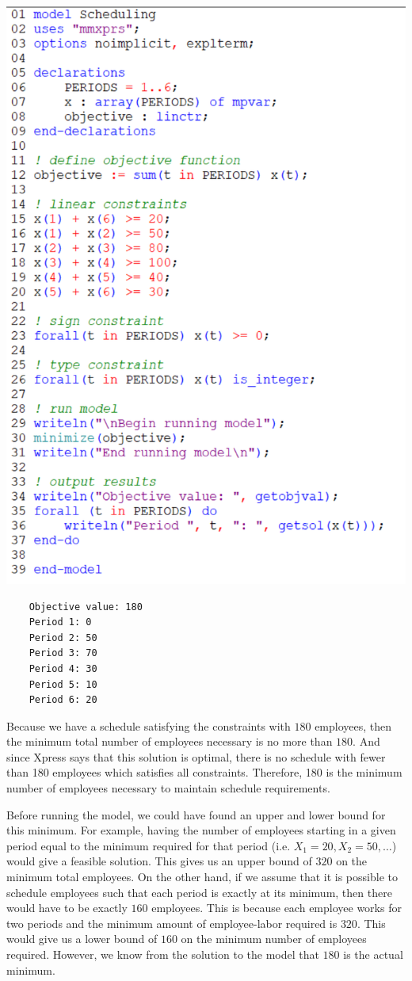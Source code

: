 \documentclass[12pt]{article}
\theoremstyle{definition}
\begin{document}
\newpage
\includegraphics[scale=0.8]{code.png}

\lstset{basicstyle=\ttfamily}
\begin{lstlisting}
    Objective value: 180
    Period 1: 0
    Period 2: 50
    Period 3: 70
    Period 4: 30
    Period 5: 10
    Period 6: 20
\end{lstlisting}

\newpage
Because we have a schedule satisfying the constraints with $180$ employees, then the minimum total number of employees necessary is no more than $180$. And since Xpress says that this solution is optimal, there is no schedule with fewer than 180 employees which satisfies all constraints. Therefore, 180 is the minimum number of employees necessary to maintain schedule requirements. 

Before running the model, we could have found an upper and lower bound for this minimum. For example, having the number of employees starting in a given period equal to the minimum required for that period (i.e. $X_1 = 20, X_2 = 50, \dots$) would give a feasible solution. This gives us an upper bound of $320$ on the minimum total employees. On the other hand, if we assume that it is possible to schedule employees such that each period is exactly at its minimum, then there would have to be exactly $160$ employees. This is because each employee works for two periods and the minimum amount of employee-labor required is $320$. This would give us a lower bound of $160$ on the minimum number of employees required. However, we know from the solution to the model that $180$ is the actual minimum.
\end{document}
